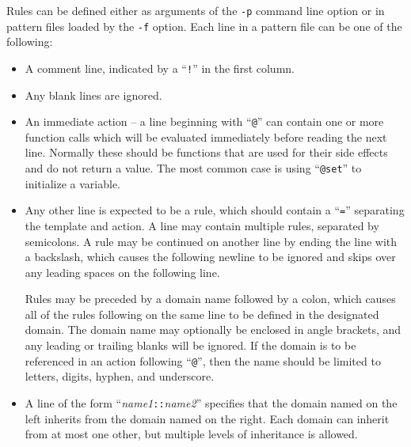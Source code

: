 Rules can be defined either as arguments of the \verb/-p/ command line
option or in pattern files loaded by the \verb/-f/ option.  Each line in
a pattern file can be one of the following:
\begin{itemize}
\item A comment line, indicated by a ``\verb/!/'' in the first column.
\item Any blank lines are ignored.
\item An immediate action -- a line beginning with ``\verb/@/'' can
contain one or more function calls which will be evaluated immediately
before reading the next line.  Normally these should be functions that
are used for their side effects and do not return a value.  The most
common case is using ``\verb/@set/'' to initialize a variable.
\item Any other line is expected to be a rule, which should contain a
``\verb/=/'' separating the template and action.  A line may contain
multiple rules, separated by semicolons.  A rule may be continued on
another line by ending the line with a backslash, which causes the
following newline to be ignored and skips over any leading spaces on the
following line.

Rules may be preceded by a domain name followed by a colon, which causes
all of the rules following on the same line to be defined in the
designated domain.  The domain name may optionally be enclosed in angle
brackets, and any leading or trailing blanks will be ignored.
If the domain is to be referenced in an action following ``\verb/@/'', then
the name should be limited to letters, digits, hyphen, and underscore.
\item A line of the form ``{\em name1}{\tt ::}{\em name2}'' specifies
that the domain named on the left inherits from the domain named on the
right.  Each domain can inherit from at most one other, but multiple levels
of inheritance is allowed.
\end{itemize}

